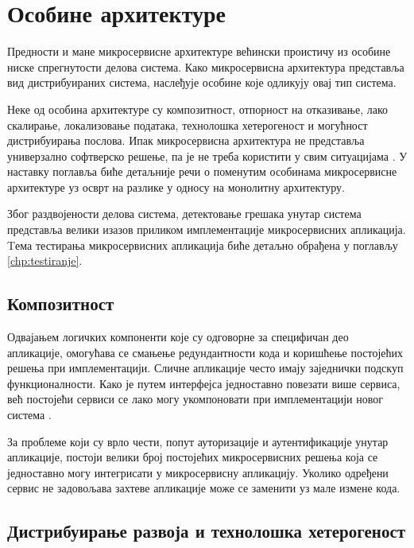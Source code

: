 \documentclass[12pt,oneside]{memoir}
\begin{document}
 \newpage

\section{Особине архитектуре}

Предности и мане микросервисне архитектуре већински проистичу из особине ниске спрегнутости делова система. Како микросервисна архитектура представља вид дистрибуираних система, наслеђује особине које одликују овај тип система.

Неке од особина архитектуре су композитност, отпорност на отказивање, лако скалирање, локализовање података, технолошка хетерогеност и могућност дистрибуирања послова. Ипак микросервисна архитектура не представља универзално софтверско решење, па је не треба користити у свим ситуацијама \cite{microservicesBook}. У наставку поглавља биће детаљније речи о поменутим особинама микросервисне архитектуре уз осврт на разлике у односу на монолитну архитектуру. 

Због раздвојености делова система, детектовање грешака унутар система представља велики изазов приликом имплементације микросервисних апликација. Tема тестирања микросервисних апликација биће детаљно обрађена у поглављу \ref{chp:testiranje}.

\subsection{Композитност}

Одвајањем логичких компоненти које су одговорне за специфичан део апликације, омогућава се смањење редундантности кода и коришћење постојећих решења при имплементацији. Сличне апликације често имају заједнички подскуп функционалности. Како је путем интерфејса једноставно повезати више сервиса, већ постојећи сервиси се лако могу укомпоновати при имплементацији новог система \cite{microservicesBook}. 

За проблеме који су врло чести, попут ауторизације и аутентификације унутар апликације, постоји велики број постојећих микросервисних решења која се једноставно могу интегрисати у микросервисну апликацију. Уколико одређени сервис не задовољава захтеве апликације може се заменити уз мале измене кода.

\subsection{Дистрибуирање развоја и технолошка хетерогеност}
\end{document}
